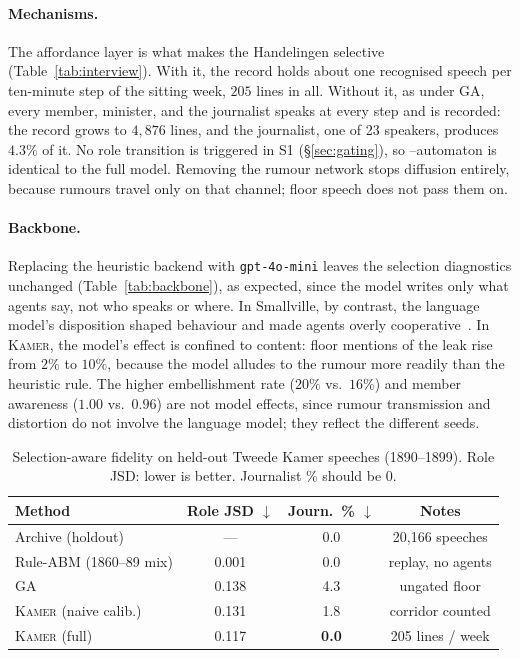 \documentclass[sigconf,review,anonymous]{acmart}
\newcommand{\sys}{\textsc{Kamer}}
\begin{document}
\paragraph{Mechanisms.} The affordance layer is what makes the
Handelingen selective (Table~\ref{tab:interview}). With it, the record
holds about one recognised speech per ten-minute step of the sitting week,
$205$ lines in all. Without it, as under GA, every member, minister, and the
journalist speaks at every step and is recorded: the record grows to
$4{,}876$ lines, and the journalist, one of 23 speakers, produces $4.3\%$
of it. No role transition is triggered in S1 (\S\ref{sec:gating}), so
--automaton is identical to the full model. Removing the rumour network
stops diffusion entirely, because rumours travel only on that channel;
floor speech does not pass them on.

\paragraph{Backbone.} Replacing the heuristic backend with
\texttt{gpt-4o-mini} leaves the selection diagnostics unchanged
(Table~\ref{tab:backbone}), as expected, since the model writes only what
agents say, not who speaks or where. In Smallville, by contrast, the
language model's disposition shaped behaviour and made agents overly
cooperative~\cite{park2023generative}. In \sys{}, the model's effect is
confined to content: floor mentions of the leak rise from $2\%$ to $10\%$,
because the model alludes to the rumour more readily than the heuristic
rule. The higher
embellishment rate ($20\%$ vs.\ $16\%$) and member awareness ($1.00$
vs.\ $0.96$) are not model effects, since rumour transmission and
distortion do not involve the language model; they reflect the different
seeds.

\begin{table}[t]
\caption{Selection-aware fidelity on held-out Tweede Kamer speeches
(1890--1899). Role JSD: lower is better. Journalist \% should be $0$.}
\label{tab:main}
\centering\small
\setlength{\tabcolsep}{4pt}
\begin{tabular}{lccc}
\toprule
Method & Role JSD $\downarrow$ & Journ.\ \% $\downarrow$ & Notes \\
\midrule
Archive (holdout) & --- & 0.0 & 20{,}166 speeches \\
Rule-ABM (1860--89 mix) & 0.001 & 0.0 & replay, no agents \\
GA~\cite{park2023generative} & 0.138 & 4.3 & ungated floor \\
\sys{} (naive calib.) & 0.131 & 1.8 & corridor counted \\
\sys{} (full) & 0.117 & \textbf{0.0} & 205 lines / week \\
\bottomrule
\end{tabular}
\end{table}
\end{document}

